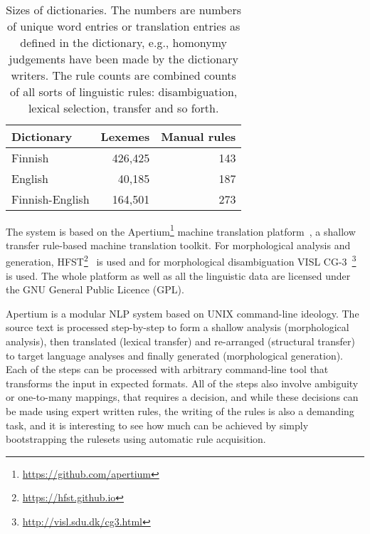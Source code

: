 \documentclass[free]{flammie}
\begin{document}
\begin{table}
    \begin{center}
    \begin{tabular}{lrr}
        \toprule
        Dictionary & Lexemes & Manual rules \\
        \midrule
        Finnish & 426,425 & 143 \\
        English & 40,185 & 187 \\
        Finnish-English & 164,501 & 273 \\
        \bottomrule
    \end{tabular}
    \caption{Sizes of dictionaries. The numbers are numbers of unique word
    entries or translation entries as defined in the dictionary, e.g., homonymy
    judgements have been made by the dictionary
    writers. The rule counts are combined counts of all sorts of linguistic
    rules: disambiguation, lexical selection, transfer and so
    forth.\label{table:dictionaries}}
    \end{center}
\end{table}


The system is based on the Apertium\footnote{\url{https://github.com/apertium}}
machine translation platform~\cite{forcada2011apertium}, a shallow transfer
rule-based machine translation toolkit. For morphological analysis and
generation, HFST\footnote{\url{https://hfst.github.io}}~\cite{linden2011hfst} is
used and for morphological disambiguation VISL
CG-3~\footnote{\url{http://visl.sdu.dk/cg3.html}} is used.  The whole platform
as well as all the linguistic data are licensed under the GNU General Public
Licence (GPL).

Apertium is a modular NLP system based on UNIX command-line ideology. The source
text is processed step-by-step to form a shallow analysis (morphological
analysis), then translated (lexical transfer) and re-arranged (structural
transfer) to target language analyses and finally generated (morphological
generation). Each of the steps can be processed with arbitrary command-line tool
that transforms the input in expected formats. All of the steps also involve
ambiguity or one-to-many mappings, that requires a decision, and while these
decisions can be made using expert written rules, the writing of the rules is
also a demanding task, and it is interesting to see how much can be achieved by
simply bootstrapping the rulesets using automatic rule acquisition.
\end{document}
